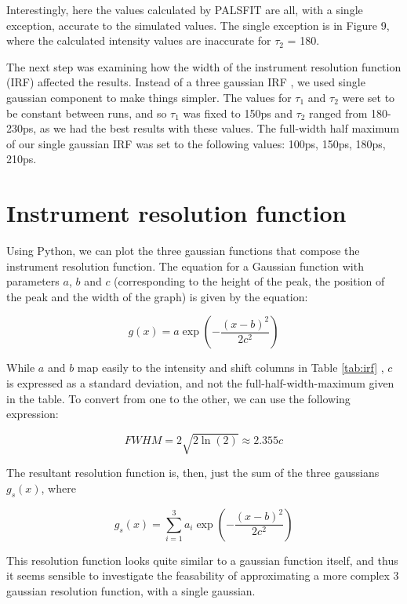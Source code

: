 Interestingly, here the values calculated by PALSFIT are all, with a single exception, accurate to the simulated values. The single exception is in Figure 9, where the calculated intensity values are inaccurate for $\tau_2$ = 180.

The next step was examining how the width of the instrument resolution function (IRF) affected the results. Instead of a three gaussian IRF ,  we used single gaussian component to make things simpler. The values for $\tau_1$ and $\tau_2$ were set to be constant between runs, and so $\tau_1$ was fixed to 150ps and $\tau_2$ ranged from 180-230ps, as we had the best results with these values. The full-width half maximum of our single gaussian IRF was set to the following values: 100ps, 150ps, 180ps, 210ps.

\section{Instrument resolution function}

Using Python, we can plot the three gaussian functions that compose the instrument resolution function. The equation for a Gaussian function with parameters $a$, $b$ and $c$ (corresponding to the height of the peak, the position of the peak and the width of the graph) is given by the equation:

\[g(x) = a\exp{\left(-\frac{(x-b)^2}{2c^2}\right)} \]

While $a$ and $b$ map easily to the intensity and shift columns in Table \ref{tab:irf} ,  $c$ is expressed as a standard deviation, and not the full-half-width-maximum given in the table. To convert from one to the other, we can use the following expression:

\[ FWHM = 2\sqrt{2\ln(2)} \approx 2.355c \]

The resultant resolution function is, then, just the sum of the three gaussians $g_s(x)$, where

\[g_s(x) = \sum_{i=1}^{3}{a_i \exp{\left(-\frac{(x-b)^2}{2c^2}\right)}}\]

This resolution function looks quite similar to a gaussian function itself, and thus it seems sensible to investigate the feasability of approximating a more complex 3 gaussian resolution function, with a single gaussian.

